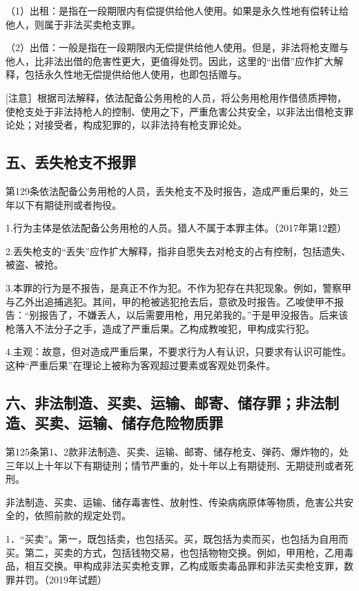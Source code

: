（1）出租：是指在一段期限内有偿提供给他人使用。如果是永久性地有偿转让给他人，则属于非法买卖枪支罪。

（2）出借：一般是指在一段期限内无偿提供给他人使用。但是，非法将枪支赠与他人，比非法出借的危害性更大，更值得处罚。因此，这里的“出借”应作扩大解释，包括永久性地无偿提供给他人使用，也即包括赠与。

[注意］根据司法解释，依法配备公务用枪的人员，将公务用枪用作借债质押物，使枪支处于非法持枪人的控制、使用之下，严重危害公共安全，以非法出借枪支罪论处；对接受者，构成犯罪的，以非法持有枪支罪论处。

\subsection*{五、丢失枪支不报罪}

第129条依法配备公务用枪的人员，丢失枪支不及时报告，造成严重后果的，处三年以下有期徒刑或者拘役。

1.行为主体是依法配备公务用枪的人员。猎人不属于本罪主体。（2017年第12题）

2.丢失枪支的“丢失”应作扩大解释，指非自愿失去对枪支的占有控制，包括遗失、被盗、被抢。

3.本罪的行为是不报告，是真正不作为犯。不作为犯存在共犯现象。例如，警察甲与乙外出追捕逃犯。其间，甲的枪被逃犯抢去后，意欲及时报告。乙唆使甲不报告：“别报告了，不嫌丢人，以后需要用枪，用兄弟我的。”于是甲没报告。后来该枪落入不法分子之手，造成了严重后果。乙构成教唆犯，甲构成实行犯。

4.主观：故意，但对造成严重后果，不要求行为人有认识，只要求有认识可能性。这种“严重后果”在理论上被称为客观超过要素或客观处罚条件。

\subsection*{六、非法制造、买卖、运输、邮寄、储存罪；非法制造、买卖、运输、储存危险物质罪}

第125条第1、2款非法制造、买卖、运输、邮寄、储存枪支、弹药、爆炸物的，处三年以上十年以下有期徒刑；情节严重的，处十年以上有期徒刑、无期徒刑或者死刑。

非法制造、买卖、运输、储存毒害性、放射性、传染病病原体等物质，危害公共安全的，依照前款的规定处罚。

1．“买卖”。第一，既包括卖，也包括买。买，既包括为卖而买，也包括为自用而买。第二，买卖的方式，包括钱物交易，也包括物物交换。例如，甲用枪，乙用毒品，相互交换。甲构成非法买卖枪支罪，乙构成贩卖毒品罪和非法买卖枪支罪，数罪并罚。（2019年试题）


